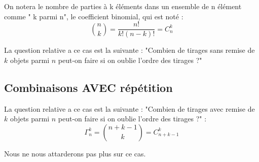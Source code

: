 On notera le nombre de parties à k éléments dans un ensemble de n élément comme " k parmi n", le coefficient binomial, qui est noté :
\[
\binom{n}{k}=\frac{n!}{k!(n-k)!}=C_{n}^{k}
\]

La question relative a ce cas est la suivante : "Combien de tirages sans remise de \(k\) objets parmi \(n\) peut-on faire si on oublie l'ordre des tirages ?"

\subsection{Combinaisons AVEC répétition}
La question relative a ce cas est la suivante : "Combien de tirages avec remise de \(k\) objets parmi \(n\) peut-on faire si on oublie l'ordre des tirages ?" :
\[
\Gamma_{n}^{k}=\binom{n+k-1}{k}=C_{n+k-1}^{k}
\]

Nous ne nous attarderons pas plus sur ce cas.